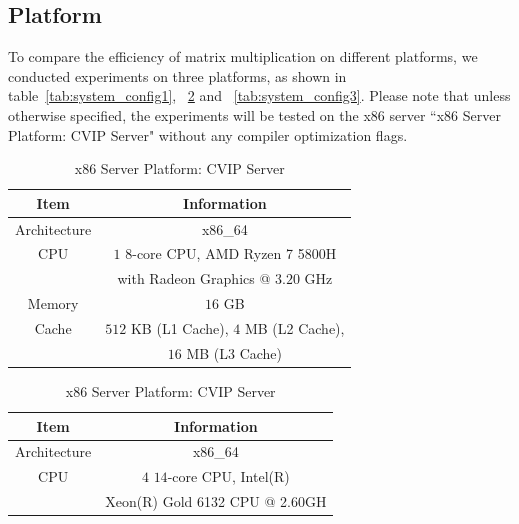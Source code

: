 \documentclass[conference]{IEEEtran}
\begin{document}
	\subsection{Platform}
	To compare the efficiency of matrix multiplication on different platforms, we conducted experiments on three platforms, as shown in table~\ref{tab:system_config1}, ~\ref{tab:system_config2} and ~\ref{tab:system_config3}. Please note that unless otherwise specified, the experiments will be tested on the x86 server ``x86 Server Platform: CVIP Server" without any compiler optimization flags.
	
	\begin{table}[htbp]
		 \centering
		 \begin{minipage}[t]{\linewidth}
		 	\centering
		 	\caption{x86 PC Platform: Lenovo Xiaoxin Pro 16}
		 	\label{tab:system_config1}
		 	\setlength\extrarowheight{2pt}
		 	\begin{tabular}{|c|c|}
		 		\hline
		 		Item & Information                                                                               \\ \hline
		 		Architecture & x86\_64                                                                            \\ \hline
		 		CPU              & $1$ $8$-core CPU, AMD Ryzen 7 5800H \\ 
		 		& with Radeon Graphics  @ $3.20$ GHz                                                                 \\ \hline
		 		Memory     & $16$ GB                                                                                     \\ \hline
		 		Cache            & $512$ KB (L1 Cache), $4$ MB (L2 Cache), \\
		 		& $16$ MB (L3 Cache)           \\ \hline
		 	\end{tabular}
		\end{minipage}
	 	\hspace{\linewidth}
	 	\begin{minipage}[t]{\linewidth}
	 		\centering
	 		\caption{x86 Server Platform: CVIP Server}
	 		\label{tab:system_config2}
	 		\setlength\extrarowheight{2pt}
	 		\begin{tabular}{|c|c|}
	 			\hline
	 			Item & Information \\ \hline
	 			Architecture & x86\_64 \\ \hline
	 			CPU & $4$ $14$-core CPU, Intel(R) \\ 
	 			& Xeon(R) Gold 6132 CPU @ 2.60GH \\ \hline

\end{tabular}
\end{minipage}
\end{table}
\end{document}
